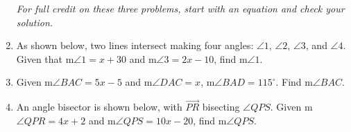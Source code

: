 \begin{enumerate}
\emph{For full credit on these three problems, start with an equation and check your solution.}
\item As shown below, two lines intersect making four angles: $\angle 1$, $\angle 2$, $\angle 3$, and $\angle 4$. Given that m$\angle 1= x+30$ and m$\angle 3=2x-10$, find m$\angle 1$.
  \begin{flushright}
    \end{flushright}

\item Given m$\angle BAC = 5x-5$ and m$\angle DAC = x$, m$\angle BAD=115^\circ$. Find m$\angle BAC$.
  \begin{flushright}
  \end{flushright} \vspace{1cm}

\item An angle bisector is shown below, with $\overrightarrow{PR}$ bisecting $\angle QPS$. Given m$\angle QPR = 4x+2$ and m$\angle QPS = 10x-20$, find m$\angle QPS$.
    \begin{flushright}
    \end{flushright}


\end{enumerate}
